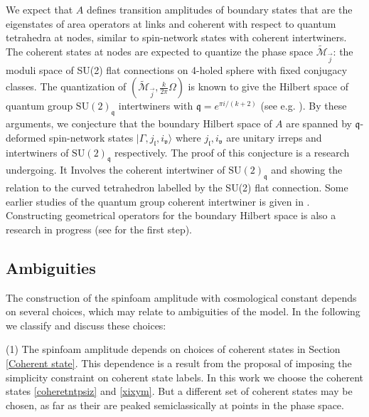\documentclass[aps,prd,notitlepage,nofootinbib,superscriptaddress,groupedaddress,twocolumn]{revtex4-1}
\newcommand{\Su}{\mathrm{SU}(2)}
\newcommand{\cm}{\mathcal M}
\newcommand{\fl}{\mathfrak{l}}  \newcommand{\Fl}{\mathfrak{L}}
\newcommand{\fq}{\mathfrak{q}}  \newcommand{\Fq}{\mathfrak{Q}}
\newcommand{\fv}{\mathfrak{v}}  \newcommand{\Fv}{\mathfrak{V}}
\newcommand{\G}{\Gamma}
\renewcommand{\O}{\Omega}
\begin{document}
We expect that $A$ defines transition amplitudes of boundary states that are the eigenstates of area operators at links and coherent with respect to quantum tetrahedra at nodes, similar to spin-network states with coherent intertwiners. The coherent states at nodes are expected to quantize the phase space $\widetilde{\cm}_{\vec{j}}$: the moduli space of SU(2) flat connections on 4-holed sphere with fixed conjugacy classes. The quantization of $(\widetilde{\cm}_{\vec{j}},\frac{k}{2\pi}\O)$ is known to give the Hilbert space of quantum group $\Su_{\fq}$ intertwiners with $\fq=e^{\pi i/(k+2)}$ (see e.g. \cite{Gawedzki:1999bq,Engle2011}). By these arguments, we conjecture that the boundary Hilbert space of $A$ are spanned by $\fq$-deformed spin-network states $|\G,j_\fl,i_\fv\rangle$ where $j_\fl, i_\fv$ are unitary irreps and intertwiners of $\Su_{\fq}$ respectively. The proof of this conjecture is a research undergoing. It Involves the coherent intertwiner of $\Su_{\fq}$ and showing the relation to the curved tetrahedron labelled by the SU(2) flat connection. Some earlier studies of the quantum group coherent intertwiner is given in \cite{Ding:2011hp}. Constructing geometrical operators for the boundary Hilbert space is also a research in progress (see \cite{Han:2016dnt} for the first step). 




\subsection{Ambiguities}\label{Ambiguities}


The construction of the spinfoam amplitude with cosmological constant depends on several choices, which may relate to ambiguities of the model. In the following we classify and discuss these choices: 

(1) The spinfoam amplitude depends on choices of coherent states in Section \ref{Coherent state}. This dependence is a result from the proposal of imposing the simplicity constraint on coherent state labels. In this work we choose the coherent states \eqref{coheretntpsiz} and \eqref{xixym}. But a different set of coherent states may be chosen, as far as their are peaked semiclassically at points in the phase space. %
\end{document}
